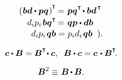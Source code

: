 \begin{otherlanguage}{russian}
\nopagebreak\vspace{-0.2em}\begin{equation*}\begin{array}{r@{\hspace{.3em}}c@{\hspace{.3em}}l}
\left(\hspace{.1ex} \bm{b}\bm{d} \dotp \bm{p}\bm{q} \hspace{.1ex}\right)^{\hspace{-0.1ex}\T} & \hspace{-0.5ex} = & \hspace{-0.1ex} \bm{p}\bm{q}^{\T} \hspace{-0.25ex} \dotp \bm{b}\bm{d}^{\hspace{.25ex}\T}
\\[.2em]
d_i p_i \hspace{.25ex} \bm{b}\bm{q}^{\T} & \hspace{-0.5ex} = & \hspace{-0.1ex} \bm{q}\bm{p} \dotp \bm{d} \bm{b}
\\[.1em]
d_i p_i \hspace{.25ex} \bm{q}\bm{b} & = & p_i d_i \hspace{.25ex} \bm{q}\bm{b} \;\; ).
\end{array}\end{equation*}

\end{otherlanguage}


\nopagebreak\vspace{-0.2em}\begin{equation}\label{vectortensordotproduct}
\bm{c} \dotp \bm{B} = \bm{B}^{\T} \hspace{-0.4ex}\dotp \bm{c} , \;\;
\bm{B} \dotp \bm{c} = \bm{c} \hspace{.2ex}\dotp \bm{B}^{\T} \hspace{-0.3ex}.
\end{equation}



\nopagebreak\vspace{-0.2em}\begin{equation}\label{exponentiation:two}
\bm{B}^2 \equiv\hspace{.2ex} \bm{B} \hspace{-0.1ex} \dotp \hspace{-0.1ex} \bm{B} .
\end{equation}

